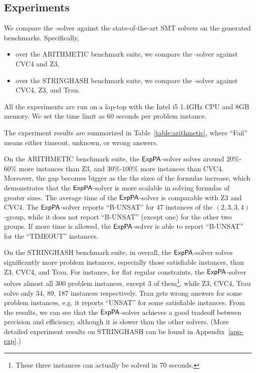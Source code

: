 \vspace*{-4mm}
\subsection{Experiments}

We compare the {\paexp}-solver against the state-of-the-art SMT solvers on the generated benchmarks. Specifically, 
\begin{itemize}
\item over the ARITHMETIC benchmark suite, we compare the {\paexp}-solver against CVC4 and Z3,
\item over the STRINGHASH benchmark suite, we compare the {\paexp}-solver against CVC4, Z3, and Trau. 
\end{itemize}
All the experiments are run on a lap-top with the Intel i5 1.4GHz CPU and 8GB memory. We set the time limit as 60 seconds per problem instance. 

The experiment results are summarized in Table~\ref{table:arithmetic}, where ``Fail'' means either timeout, unknown, or wrong answers. 

On the ARITHMETIC benchmark suite, the ${\sf ExpPA}$-solver solves around $20\%$-$60\%$ more instances than Z3, and $30\%$-$100\%$ more instances than CVC4. Moreover, the gap becomes bigger as the the sizes of the formulas increase, which demonstrates that the ${\sf ExpPA}$-solver is more scalable in solving formulas of greater sizes. The average time of the ${\sf ExpPA}$-solver is comparable with Z3 and CVC4. The ${\sf ExpPA}$-solver reports ``B-UNSAT'' for 47 instances of the $(2, 3, 3, 4)$-group, while it does not report ``B-UNSAT'' (except one) for the other two groups. If more time is allowed, the ${\sf ExpPA}$-solver is able to report ``B-UNSAT'' for the ``TIMEOUT'' instances. 



On the STRINGHASH benchmark suite, in overall, the ${\sf ExpPA}$-solver solves significantly more problem instances, especially those satisfiable instances, than Z3, CVC4, and Trau. For instance, for flat regular constraints, the ${\sf ExpPA}$-solver solves almost all 300 problem instances, except 3 of them\footnote{These three instances can actually be solved in 70 seconds.}, while  Z3, CVC4, Trau solve only 34, 89, 187 instances respectively.  Trau gets wrong answers for some problem instances, e.g. it reports ``UNSAT'' for some satisfiable instances. 
From the results, we can see that the ${\sf ExpPA}$-solver achieves a good tradeoff between precision and efficiency, although it is slower than the other solvers. (More detailed experiment results on STRINGHASH can be found in Appendix~\ref{app-exp}.)



